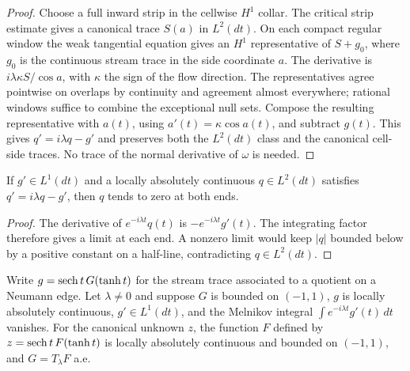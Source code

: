 \begin{proof}
\leanok
Choose a full inward strip in the cellwise $H^1$ collar. The critical
strip estimate gives a canonical trace $S(a)$ in $L^2(dt)$.
On each compact regular window the weak tangential equation gives
an $H^1$ representative of $S+g_0$, where $g_0$ is the continuous
stream trace in the side coordinate $a$. The derivative is
$i\lambda\kappa S/\cos a$, with $\kappa$ the sign of the flow direction.
The representatives agree pointwise on overlaps by continuity and
agreement almost everywhere; rational windows suffice to combine the
exceptional null sets. Compose the resulting representative with
$a(t)$, using $a'(t)=\kappa\cos a(t)$, and subtract $g(t)$.
This gives $q'=i\lambda q-g'$ and preserves both the $L^2(dt)$ class
and the canonical cell-side traces. No trace of the normal derivative
of $\omega$ is needed.
\end{proof}

\begin{lemma}
\label{lem:mixed-vorticity-profile-decay}
\leanok
If $g'\in L^1(dt)$ and a locally absolutely continuous $q\in L^2(dt)$
satisfies $q'=i\lambda q-g'$, then $q$ tends to zero at both ends.
\end{lemma}

\begin{proof}
The derivative of $e^{-i\lambda t}q(t)$ is $-e^{-i\lambda t}g'(t)$.
The integrating factor therefore gives a limit at each end. A nonzero
limit would keep $|q|$ bounded below by a positive constant on a half-line,
contradicting $q\in L^2(dt)$.
\leanok
\end{proof}

\begin{lemma}
\label{lem:mixed-neumann-canonical-transport}
\leanok
Write $g=\operatorname{sech} t\,G(\tanh t)$ for the stream trace associated to a
quotient on a Neumann edge. Let $\lambda\ne0$ and suppose $G$ is bounded
on $(-1,1)$, $g$ is locally absolutely continuous, $g'\in L^1(dt)$, and the
Melnikov integral $\int e^{-i\lambda t}g'(t)\,dt$ vanishes. For the canonical
unknown $z$, the function $F$ defined by $z=\operatorname{sech} t\,F(\tanh t)$ is locally
absolutely continuous and bounded on $(-1,1)$, and $G=T_\lambda F$ a.e.
\end{lemma}

